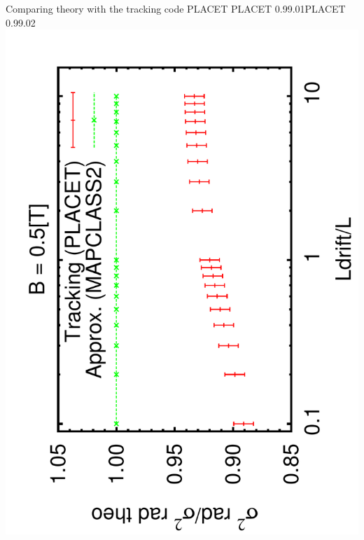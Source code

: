 \documentclass{beamer}
\begin{document}
\begin{frame}{Comparing theory with the tracking code PLACET}
\hspace*{2.2cm}PLACET 0.99.01\hspace*{2.8cm}PLACET 0.99.02
 \includegraphics[scale=0.24,angle=-90]{sigma_Ldrift.pdf}

\end{frame}
\end{document}
